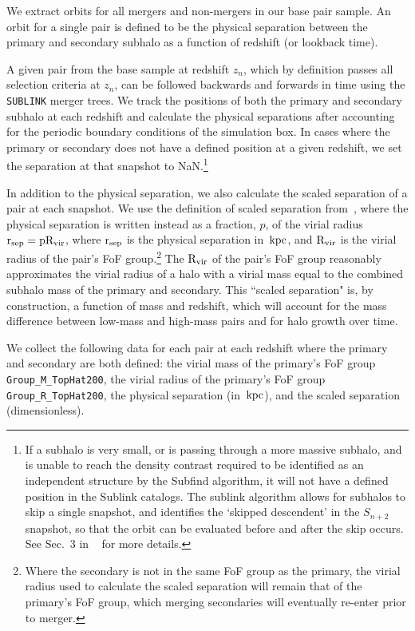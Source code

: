 \documentclass[twocolumn,linenumbers]{aastex631}
\newcommand{\Rvir}{\ensuremath{\rm R_{vir}}}
\newcommand{\rsep}{\ensuremath{\rm r_{sep}}}
\begin{document}
We extract orbits for all mergers and non-mergers in our base pair sample. 
An orbit for a single pair is defined to be the physical separation between the primary and secondary subhalo as a function of redshift (or lookback time). 

A given pair from the base sample at redshift $z_n$, which by definition passes all selection criteria at $z_n$, can be followed backwards and forwards in time using the \texttt{SUBLINK} merger trees.  
We track the positions of both the primary and secondary subhalo at each redshift and calculate the physical separations after accounting for the periodic boundary conditions of the simulation box.
In cases where the primary or secondary does not have a defined position at a given redshift, we set the separation at that snapshot to NaN.\footnote{If a subhalo is very small, or is passing through a more massive subhalo, and is unable to reach the density contrast required to be identified as an independent structure by the Subfind algorithm, it will not have a defined position in the Sublink catalogs. The sublink algorithm allows for subhalos to skip a single snapshot, and identifies the `skipped descendent' in the $S_{n+2}$ snapshot, so that the orbit can be evaluated before and after the skip occurs. See Sec.~3 in ~\citet{RG2015} for more details.}

In addition to the physical separation, we also calculate the scaled separation of a pair at each snapshot. We use the definition of scaled separation from~\cite{Chamberlain2024}, where the physical separation is written instead as a fraction, $p$, of the virial radius $\rsep=p\Rvir$, where $\rsep$ is the physical separation in $\mathrm{\,kpc}$, and $\Rvir$ is the virial radius of the pair's FoF group.\footnote{Where the secondary is not in the same FoF group as the primary, the virial radius used to calculate the scaled separation will remain that of the primary's FoF group, which merging secondaries will eventually re-enter prior to merger.} 
The $\Rvir$ of the pair's FoF group reasonably approximates the virial radius of a halo with a virial mass equal to the combined subhalo mass of the primary and secondary.
This ``scaled separation" is, by construction, a function of mass and redshift, which will account for the mass difference between low-mass and high-mass pairs and for halo growth over time. 

We collect the following data for each pair at each redshift where the primary and secondary are both defined: the virial mass of the primary's FoF group \texttt{Group\_M\_TopHat200}, the virial radius of the primary's FoF group \texttt{Group\_R\_TopHat200}, the physical separation (in $\mathrm{\,kpc}$), and the scaled separation (dimensionless).
\end{document}
